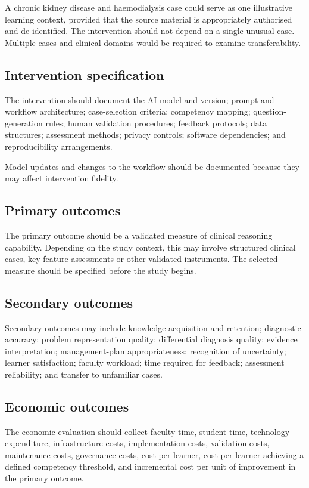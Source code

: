 \documentclass[11pt,a4paper]{article}
\begin{document}
A chronic kidney disease and haemodialysis case could serve as one illustrative learning context, provided that the source material is appropriately authorised and de-identified. The intervention should not depend on a single unusual case. Multiple cases and clinical domains would be required to examine transferability.

\subsection{Intervention specification}
The intervention should document the AI model and version; prompt and workflow architecture; case-selection criteria; competency mapping; question-generation rules; human validation procedures; feedback protocols; data structures; assessment methods; privacy controls; software dependencies; and reproducibility arrangements.

Model updates and changes to the workflow should be documented because they may affect intervention fidelity.

\subsection{Primary outcomes}
The primary outcome should be a validated measure of clinical reasoning capability. Depending on the study context, this may involve structured clinical cases, key-feature assessments or other validated instruments. The selected measure should be specified before the study begins.

\subsection{Secondary outcomes}
Secondary outcomes may include knowledge acquisition and retention; diagnostic accuracy; problem representation quality; differential diagnosis quality; evidence interpretation; management-plan appropriateness; recognition of uncertainty; learner satisfaction; faculty workload; time required for feedback; assessment reliability; and transfer to unfamiliar cases.

\subsection{Economic outcomes}
The economic evaluation should collect faculty time, student time, technology expenditure, infrastructure costs, implementation costs, validation costs, maintenance costs, governance costs, cost per learner, cost per learner achieving a defined competency threshold, and incremental cost per unit of improvement in the primary outcome.
\end{document}
